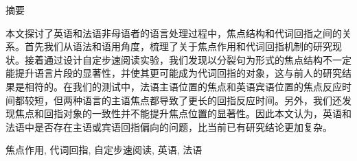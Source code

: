 \clearpage
\thispagestyle{plain}
{}

\centerline{\heiti 摘\quad 要}

\linespread{1.4} \bigskip

本文探讨了英语和法语非母语者的语言处理过程中，焦点结构和代词回指之间的关系。首先我们从语法和语用角度，梳理了关于焦点作用和代词回指机制的研究现状。接着通过设计自定步速阅读实验，我们发现以分裂句为形式的焦点结构不一定能提升语言片段的显著性，并使其更可能成为代词回指的对象，这与前人的研究结果是相符的。在我们的测试中，法语主语位置的焦点和英语宾语位置的焦点反应时间都较短，但两种语言的主语焦点都导致了更长的回指反应时间。另外，我们还发现焦点和回指对象的一致性并不能提升焦点位置的显著性。因此本文认为，英语和法语中是否存在主语或宾语回指偏向的问题，比当前已有研究结论更加复杂。
\bigskip

焦点作用, 代词回指, 自定步速阅读, 英语, 法语
